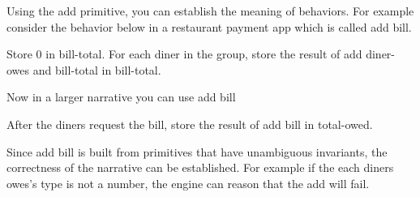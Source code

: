 Using the add primitive, you can establish the meaning of behaviors. For example consider the behavior below in a restaurant payment app which is called add bill.

\begin{greyquote}
    Store 0 in bill-total. For each diner in the group, store the result of add diner-owes and bill-total in bill-total.
\end{greyquote}

Now in a larger narrative you can use add bill

\begin{greyquote}
    After the diners request the bill, store the result of add bill in total-owed.
\end{greyquote}

Since add bill is built from primitives that have unambiguous invariants, the correctness of the narrative can be established. For example if the each diners owes's type is not a number, the engine can reason that the add will fail.

